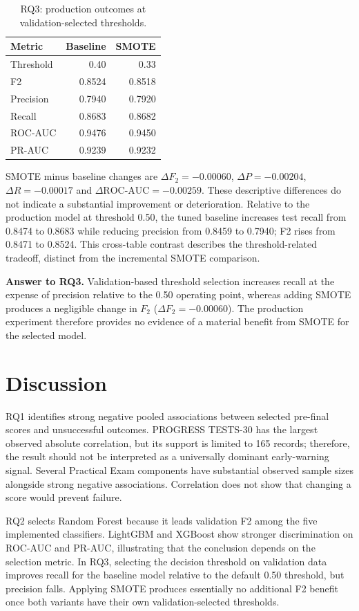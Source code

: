 \documentclass[conference]{IEEEtran}
\begin{document}
\begin{table}[t]
\caption{RQ3: production outcomes at validation-selected thresholds.}
\label{tab:prodsmote}
\centering\small
\begin{tabular}{lrr}
\toprule Metric&Baseline&SMOTE\\\midrule
Threshold&0.40&0.33\\
F2&0.8524&0.8518\\
Precision&0.7940&0.7920\\
Recall&0.8683&0.8682\\
ROC-AUC&0.9476&0.9450\\
PR-AUC&0.9239&0.9232\\\bottomrule
\end{tabular}
\end{table}

SMOTE minus baseline changes are $\Delta F_2=-0.00060$, $\Delta P=-0.00204$, $\Delta R=-0.00017$ and $\Delta\text{ROC-AUC}=-0.00259$. These descriptive differences do not indicate a substantial improvement or deterioration. Relative to the production model at threshold 0.50, the tuned baseline increases test recall from 0.8474 to 0.8683 while reducing precision from 0.8459 to 0.7940; F2 rises from 0.8471 to 0.8524. This cross-table contrast describes the threshold-related tradeoff, distinct from the incremental SMOTE comparison.

\textbf{Answer to RQ3.} Validation-based threshold selection increases recall at the expense of precision relative to the 0.50 operating point, whereas adding SMOTE produces a negligible change in $F_2$ ($\Delta F_2=-0.00060$). The production experiment therefore provides no evidence of a material benefit from SMOTE for the selected model.

\section{Discussion}
RQ1 identifies strong negative pooled associations between selected pre-final scores and unsuccessful outcomes. PROGRESS TESTS-30 has the largest observed absolute correlation, but its support is limited to 165 records; therefore, the result should not be interpreted as a universally dominant early-warning signal. Several Practical Exam components have substantial observed sample sizes alongside strong negative associations. Correlation does not show that changing a score would prevent failure.

RQ2 selects Random Forest because it leads validation F2 among the five implemented classifiers. LightGBM and XGBoost show stronger discrimination on ROC-AUC and PR-AUC, illustrating that the conclusion depends on the selection metric. In RQ3, selecting the decision threshold on validation data improves recall for the baseline model relative to the default 0.50 threshold, but precision falls. Applying SMOTE produces essentially no additional F2 benefit once both variants have their own validation-selected thresholds.
\end{document}
